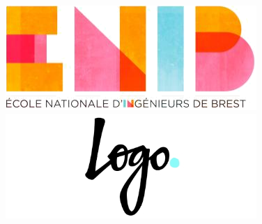 \documentclass[a4paper, twoside]{article} %
\begin{document}

\begin{figure}[t]
	\begin{minipage}[b]{0.2\linewidth}
		\raggedright \includegraphics[scale=0.5]{enib.jpg}
	\end{minipage}\hfill
	\begin{minipage}[b]{0.4\linewidth}	
		\raggedleft \includegraphics[scale=0.5]{logo.jpg}
	\end{minipage}
\end{figure}
\end{document}
